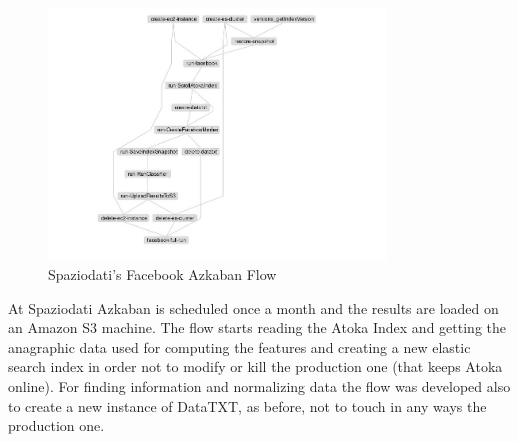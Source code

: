 \begin{figure}
\centering
\includegraphics[width=0.8\textwidth]{img/azk_flow.jpg}
\caption{Spaziodati's Facebook Azkaban Flow}
\label{}
\end{figure}

At Spaziodati Azkaban is scheduled once a month and the results are loaded on an Amazon S3 machine. The flow starts reading the Atoka Index and getting the anagraphic data used for computing the features and creating a new elastic search index in order not to modify or kill the production one (that keeps Atoka online). For finding information and normalizing data the flow was developed also to create a new instance of DataTXT, as before, not to touch in any ways the production one. 



